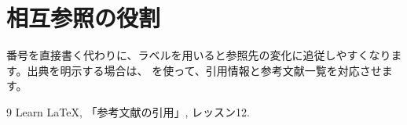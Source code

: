 \documentclass[dvipdfmx]{jlreq}
\begin{document}
\section{相互参照の役割}

番号を直接書く代わりに、ラベルを用いると参照先の変化に追従しやすくなります。出典を明示する場合は、
\cite{learnlatex12}を使って、引用情報と参考文献一覧を対応させます。

\begin{thebibliography}{9}
Learn LaTeX, 「参考文献の引用」, レッスン12.
\end{thebibliography}
\end{document}
